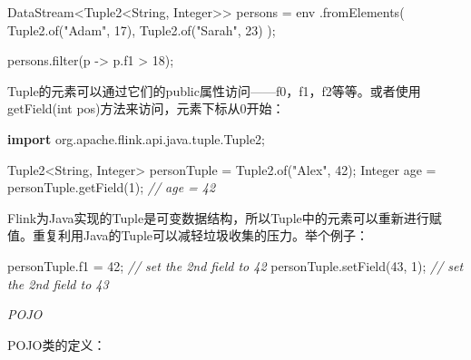 \documentclass[cn,11pt,chinese]{elegantbook}
\newenvironment{Shaded}{}{}
\newcommand{\BuiltInTok}[1]{#1}
\newcommand{\CommentTok}[1]{\textcolor[rgb]{0.38,0.63,0.69}{\textit{#1}}}
\newcommand{\DecValTok}[1]{\textcolor[rgb]{0.25,0.63,0.44}{#1}}
\newcommand{\FunctionTok}[1]{\textcolor[rgb]{0.02,0.16,0.49}{#1}}
\newcommand{\ImportTok}[1]{#1}
\newcommand{\KeywordTok}[1]{\textcolor[rgb]{0.00,0.44,0.13}{\textbf{#1}}}
\newcommand{\NormalTok}[1]{#1}
\newcommand{\StringTok}[1]{\textcolor[rgb]{0.25,0.44,0.63}{#1}}
\begin{document}
\begin{Shaded}
\begin{Highlighting}[]
\NormalTok{DataStream\textless{}Tuple2\textless{}}\BuiltInTok{String}\NormalTok{, }\BuiltInTok{Integer}\NormalTok{\textgreater{}\textgreater{} persons = env}
\NormalTok{  .}\FunctionTok{fromElements}\NormalTok{(}
\NormalTok{    Tuple2.}\FunctionTok{of}\NormalTok{(}\StringTok{"Adam"}\NormalTok{, }\DecValTok{17}\NormalTok{),}
\NormalTok{    Tuple2.}\FunctionTok{of}\NormalTok{(}\StringTok{"Sarah"}\NormalTok{, }\DecValTok{23}\NormalTok{)}
\NormalTok{  );}

\NormalTok{persons.}\FunctionTok{filter}\NormalTok{(p {-}\textgreater{} p.}\FunctionTok{f1}\NormalTok{ \textgreater{} }\DecValTok{18}\NormalTok{);}
\end{Highlighting}
\end{Shaded}

Tuple的元素可以通过它们的public属性访问------f0，f1，f2等等。或者使用getField(int
pos)方法来访问，元素下标从0开始：

\begin{Shaded}
\begin{Highlighting}[]
\KeywordTok{import}\ImportTok{ org.apache.flink.api.java.tuple.Tuple2;}

\NormalTok{Tuple2\textless{}}\BuiltInTok{String}\NormalTok{, }\BuiltInTok{Integer}\NormalTok{\textgreater{} personTuple = Tuple2.}\FunctionTok{of}\NormalTok{(}\StringTok{"Alex"}\NormalTok{, }\DecValTok{42}\NormalTok{);}
\BuiltInTok{Integer}\NormalTok{ age = personTuple.}\FunctionTok{getField}\NormalTok{(}\DecValTok{1}\NormalTok{); }\CommentTok{// age = 42}
\end{Highlighting}
\end{Shaded}

Flink为Java实现的Tuple是可变数据结构，所以Tuple中的元素可以重新进行赋值。重复利用Java的Tuple可以减轻垃圾收集的压力。举个例子：

\begin{Shaded}
\begin{Highlighting}[]
\NormalTok{personTuple.}\FunctionTok{f1}\NormalTok{ = }\DecValTok{42}\NormalTok{; }\CommentTok{// set the 2nd field to 42}
\NormalTok{personTuple.}\FunctionTok{setField}\NormalTok{(}\DecValTok{43}\NormalTok{, }\DecValTok{1}\NormalTok{); }\CommentTok{// set the 2nd field to 43}
\end{Highlighting}
\end{Shaded}

\emph{POJO}

POJO类的定义：
\end{document}

